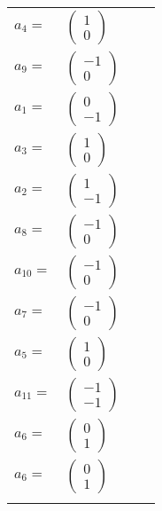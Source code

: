 \documentclass[1p]{elsarticle_modified}
\theoremstyle{definition}
\begin{document}
\begin{tabular}{m{7pt} m{180pt} m{7pt} m{180pt} }
\flushright $a_{4}=$&$\begin{pmatrix}1\\0\end{pmatrix}$ \\
\flushright $a_{9}=$&$\begin{pmatrix}-1\\0\end{pmatrix}$ \\
\flushright $a_{1}=$&$\begin{pmatrix}0\\-1\end{pmatrix}$ \\
\flushright $a_{3}=$&$\begin{pmatrix}1\\0\end{pmatrix}$ \\
\flushright $a_{2}=$&$\begin{pmatrix}1\\-1\end{pmatrix}$ \\
\flushright $a_{8}=$&$\begin{pmatrix}-1\\0\end{pmatrix}$ \\
\flushright $a_{10}=$&$\begin{pmatrix}-1\\0\end{pmatrix}$ \\
\flushright $a_{7}=$&$\begin{pmatrix}-1\\0\end{pmatrix}$ \\
\flushright $a_{5}=$&$\begin{pmatrix}1\\0\end{pmatrix}$ \\
\flushright $a_{11}=$&$\begin{pmatrix}-1\\-1\end{pmatrix}$ \\
\flushright $a_{6}=$&$\begin{pmatrix}0\\1\end{pmatrix}$\\ \flushright $a_{6}=$&$\begin{pmatrix}0\\1\end{pmatrix}$\\&\end{tabular}
\end{document}
